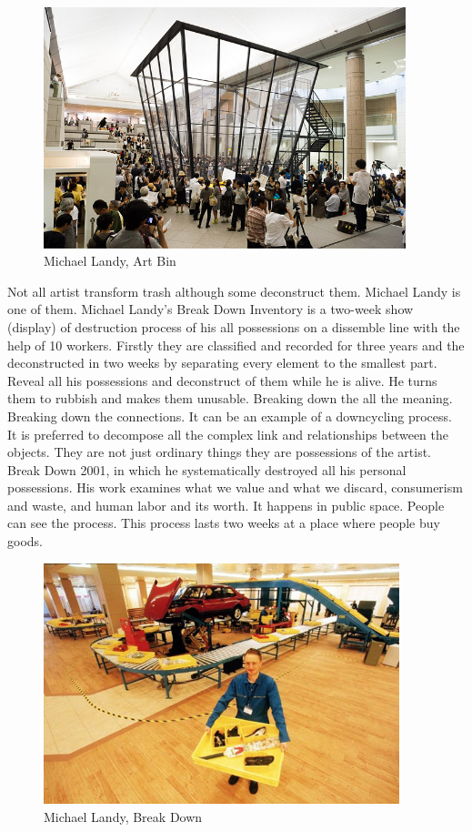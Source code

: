 \begin{figure}[h!]
  \centering
  \includegraphics[height=7cm]{graphics/MichaelLandy_ArtBin.jpg}
  \caption{Michael Landy, Art Bin}
  \label{fig:MichaelLandy_ArtBin}
\end{figure}

Not all artist transform trash although some deconstruct them. Michael Landy is one of them. Michael Landy's Break Down Inventory is a two-week show (display) of destruction process of his all possessions on a dissemble line with the help of 10 workers. Firstly they are classified and recorded for three years and the deconstructed in two weeks by separating every element to the smallest part. Reveal all his possessions and deconstruct of them while he is alive. He turns them to rubbish and makes them unusable. Breaking down the all the meaning. Breaking down the connections. It can be an example of a downcycling process. It is preferred to decompose all the complex link and relationships between the objects. They are not just ordinary things they are possessions of the artist. Break Down 2001, in which he systematically destroyed all his personal possessions. His work examines what we value and what we discard, consumerism and waste, and human labor and its worth. It happens in public space. People can see the process. This process lasts two weeks at a place where people buy goods.

\begin{figure}[h!]
  \centering
  \includegraphics[height=7cm]{graphics/MichaelLandy_BreakDown.jpg}
  \caption{Michael Landy, Break Down}
  \label{fig:MichaelLandy_BreakDown}
\end{figure}

